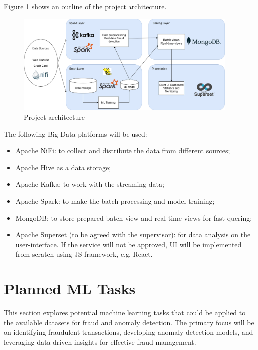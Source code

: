 \documentclass[12pt,a4paper, hidelinks]{article}
\begin{document}
Figure 1 shows an outline of the project architecture.

\begin{figure}[htbp]
    \centering
    \includegraphics[width=0.95\textwidth]{images/Architecture-M2.png}
    \caption{Project architecture}
    \label{fig:sunset}
\end{figure}

The following Big Data platforms will be used:
\begin{itemize}
    \item Apache NiFi: to collect and distribute the data from different sources;
    \item Apache Hive as a data storage;
    \item Apache Kafka: to work with the streaming data;
    \item Apache Spark: to make the batch processing and model training;
    \item MongoDB: to store prepared batch view and real-time views for fast quering;
    \item Apache Superset (to be agreed with the supervisor): for data analysis on the user-interface. If the service will not be approved, UI will be implemented from scratch using JS framework, e.g. React.
\end{itemize}

\section{Planned ML Tasks}

This section explores potential machine learning tasks that could be applied to the available datasets for fraud and anomaly detection. The primary focus will be on identifying fraudulent transactions, developing anomaly detection models, and leveraging data-driven insights for effective fraud management. 
\end{document}

